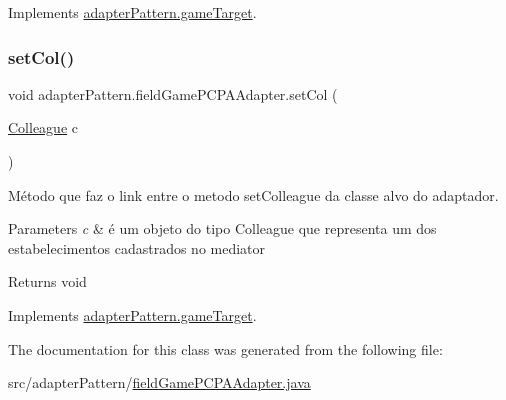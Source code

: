 Implements \mbox{\hyperlink{interfaceadapter_pattern_1_1game_target_a9ea61c0d011aa457f9a8c887d086044a}{adapter\+Pattern.\+game\+Target}}.

\mbox{\label{classadapter_pattern_1_1field_game_p_c_p_a_adapter_a3fd416ee138bfbce32b5541ffd651bfc}} 
\subsubsection{\texorpdfstring{setCol()}{setCol()}}
{\footnotesize\ttfamily void adapter\+Pattern.\+field\+Game\+P\+C\+P\+A\+Adapter.\+set\+Col (\begin{DoxyParamCaption}\item[{\mbox{\hyperlink{classmediator_pattern_1_1_colleague}{Colleague}}}]{c }\end{DoxyParamCaption})}



Método que faz o link entre o metodo set\+Colleague da classe alvo do adaptador. 


\begin{DoxyParams}{Parameters}
{\em c} & é um objeto do tipo Colleague que representa um dos estabelecimentos cadastrados no mediator \\
\hline
\end{DoxyParams}
\begin{DoxyReturn}{Returns}
void 
\end{DoxyReturn}


Implements \mbox{\hyperlink{interfaceadapter_pattern_1_1game_target_ae4493af8f85c0459e4e628ffff3fe3b9}{adapter\+Pattern.\+game\+Target}}.



The documentation for this class was generated from the following file\+:\begin{DoxyCompactItemize}
\item 
src/adapter\+Pattern/\mbox{\hyperlink{field_game_p_c_p_a_adapter_8java}{field\+Game\+P\+C\+P\+A\+Adapter.\+java}}\end{DoxyCompactItemize}
